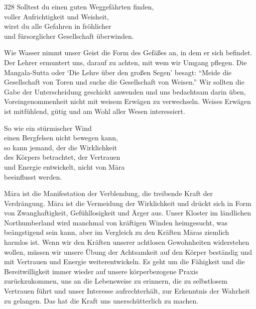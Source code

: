 
\begin{dhpVerse}{328}
\label{dhp-328}
Solltest du einen guten Weggefährten finden,\\ 
voller Aufrichtigkeit und Weisheit,\\ 
wirst du alle Gefahren in fröhlicher\\ 
und fürsorglicher Gesellschaft überwinden. 
\end{dhpVerse}

\begin{dhpRefl}

Wie Wasser nimmt unser Geist die Form des Gefäßes an, in dem er sich beﬁndet.
Der Lehrer ermuntert uns, darauf zu achten, mit wem wir Umgang pflegen. Die
Mangala-Sutta oder `Die Lehre über den großen Segen' besagt: “Meide die
Gesellschaft von Toren und suche die Gesellschaft von Weisen.” Wir sollten die
Gabe der Unterscheidung geschickt anwenden und uns bedachtsam darin üben,
Voreingenommenheit nicht mit weisem Erwägen zu verwechseln. Weises Erwägen ist
mitfühlend, gütig und am Wohl aller Wesen interessiert.

\end{dhpRefl}


\begin{dhpVerse}{8}
\label{dhp-8}
So wie ein stürmischer Wind\\ 
einen Bergfelsen nicht bewegen kann,\\ 
so kann jemand, der die Wirklichkeit\\ 
des Körpers betrachtet, der Vertrauen\\ 
und Energie entwickelt, nicht von Māra\\ 
beeinflusst werden. 
\end{dhpVerse}

\begin{dhpRefl}

Māra ist die Manifestation der Verblendung, die treibende Kraft der
Verdrängung. Māra ist die Vermeidung der Wirklichkeit und drückt sich in Form
von Zwanghaftigkeit, Gefühllosigkeit und Ärger aus. Unser Kloster im
ländlichen Northumberland wird manchmal von kräftigen Winden heimgesucht, was
beängstigend sein kann, aber im Vergleich zu den Kräften Māras ziemlich
harmlos ist. Wenn wir den Kräften unserer achtlosen Gewohnheiten widerstehen
wollen, müssen wir unsere Übung der Achtsamkeit auf den Körper beständig und
mit Vertrauen und Energie weiterentwickeln. Es geht um die Fähigkeit und die
Bereitwilligkeit immer wieder auf unsere körperbezogene Praxis zurückzukommen,
uns an die Lebensweise zu erinnern, die zu selbstlosem Vertrauen führt und
unser Interesse aufrechterhält, zur Erkenntnis der Wahrheit zu gelangen. Das
hat die Kraft uns unerschütterlich zu machen.

\end{dhpRefl}


